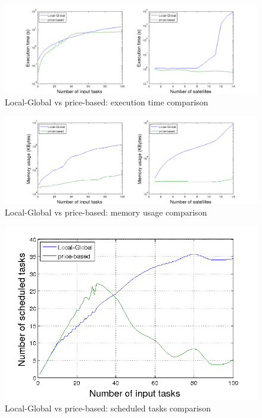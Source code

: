 \begin{figure}[ht]
  \begin{minipage}[b]{\linewidth}
    \includegraphics[width=\linewidth]{Figures/tLGMB.png}
    \caption{Local-Global vs price-based: execution time comparison}\label{fig_tLGMB}
  \end{minipage} 
\end{figure}
\begin{figure}[h!]
  \begin{minipage}[b]{\linewidth}
    \includegraphics[width=\linewidth]{Figures/mLGMB.png} 
    \caption{Local-Global vs price-based: memory usage comparison}\label{fig_mLGMB}
  \end{minipage} 
\end{figure}
\begin{figure}[ht!]
  \begin{minipage}[t]{\linewidth}
  \centering
    \includegraphics[width=0.6\linewidth]{Figures/aLGMB.png}
    \caption{Local-Global vs price-based: scheduled tasks comparison}\label{fig_aLGMB}
  \centering
  \end{minipage}
  \hfill
\end{figure}
